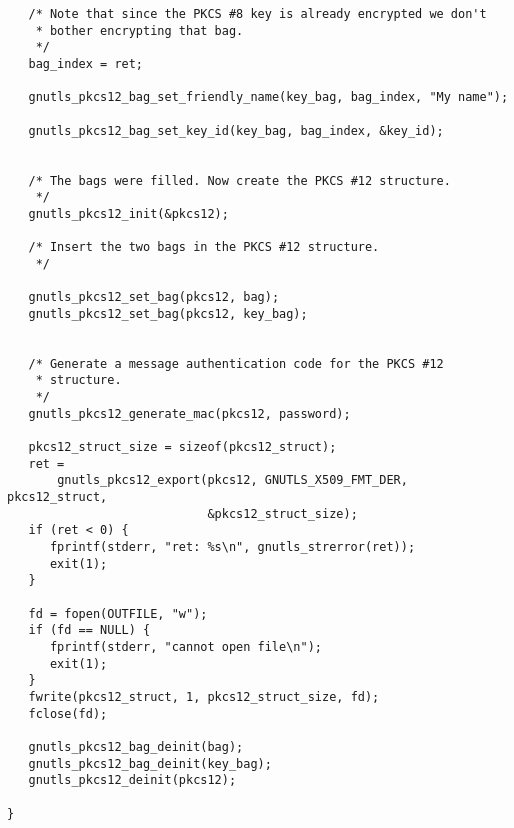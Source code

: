 \begin{verbatim}
   /* Note that since the PKCS #8 key is already encrypted we don't
    * bother encrypting that bag.
    */
   bag_index = ret;

   gnutls_pkcs12_bag_set_friendly_name(key_bag, bag_index, "My name");

   gnutls_pkcs12_bag_set_key_id(key_bag, bag_index, &key_id);


   /* The bags were filled. Now create the PKCS #12 structure.
    */
   gnutls_pkcs12_init(&pkcs12);

   /* Insert the two bags in the PKCS #12 structure.
    */

   gnutls_pkcs12_set_bag(pkcs12, bag);
   gnutls_pkcs12_set_bag(pkcs12, key_bag);


   /* Generate a message authentication code for the PKCS #12
    * structure.
    */
   gnutls_pkcs12_generate_mac(pkcs12, password);

   pkcs12_struct_size = sizeof(pkcs12_struct);
   ret =
       gnutls_pkcs12_export(pkcs12, GNUTLS_X509_FMT_DER, pkcs12_struct,
                            &pkcs12_struct_size);
   if (ret < 0) {
      fprintf(stderr, "ret: %s\n", gnutls_strerror(ret));
      exit(1);
   }

   fd = fopen(OUTFILE, "w");
   if (fd == NULL) {
      fprintf(stderr, "cannot open file\n");
      exit(1);
   }
   fwrite(pkcs12_struct, 1, pkcs12_struct_size, fd);
   fclose(fd);

   gnutls_pkcs12_bag_deinit(bag);
   gnutls_pkcs12_bag_deinit(key_bag);
   gnutls_pkcs12_deinit(pkcs12);

}

\end{verbatim}
